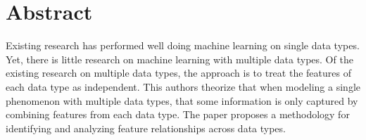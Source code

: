 \section{Abstract}
Existing research has performed well doing machine learning on single data types. Yet, there is little research on machine learning with multiple data types.  Of the existing research on multiple data types, the approach is to treat the features of each data type as independent. This authors theorize that when modeling a single phenomenon with multiple data types, that some information is only captured by combining features from each data type. The paper proposes a methodology for identifying and analyzing feature relationships across data types.  







